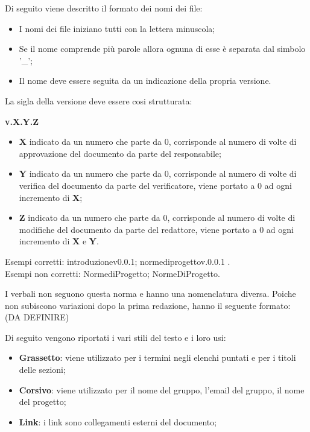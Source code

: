 Di seguito viene descritto il formato dei nomi dei file:
\begin{itemize}
\item I nomi dei file iniziano tutti con la lettera minuscola;
\item Se il nome comprende più parole allora ognuna di esse è separata dal simbolo '\_';
\item Il nome deve essere seguita da un indicazione della propria versione.
\end {itemize}
La sigla della versione deve essere cosi strutturata:
\begin{center}
    \large{\textbf{v.X.Y.Z}}
\end{center}
\begin{itemize}
\item \textbf{X} indicato da un numero che parte da 0, corrisponde al numero di volte di approvazione del documento da parte del responsabile;
\item \textbf{Y} indicato da un numero che parte da 0, corrisponde al numero di volte di verifica del documento da parte del verificatore, viene portato a 0 ad ogni incremento di \textbf{X};
\item \textbf{Z} indicato da un numero che parte da 0, corrisponde al numero di volte di modifiche del documento da parte del redattore, viene portato a 0 ad ogni incremento di \textbf{X} e \textbf{Y}.
\end {itemize}
Esempi corretti: introduzione\textunderscore v0.0.1; norme\textunderscore di\textunderscore progetto\textunderscore v.0.0.1 .\\
Esempi non corretti: Norme\textunderscore di\textunderscore Progetto; NormeDiProgetto.

I verbali non seguono questa norma e hanno una nomenclatura diversa. Poiche non subiscono variazioni dopo la prima redazione, hanno il seguente formato: (DA DEFINIRE)

Di seguito vengono riportati i vari stili del testo e i loro usi:
\begin {itemize}
\item \textbf{Grassetto}: viene utilizzato per i termini negli elenchi puntati e per i titoli delle sezioni;
\item \textbf{Corsivo}: viene utilizzato per il nome del gruppo, l'email del gruppo, il nome del progetto;
\item \textbf{Link}: i link sono collegamenti esterni del documento;
\end {itemize}

